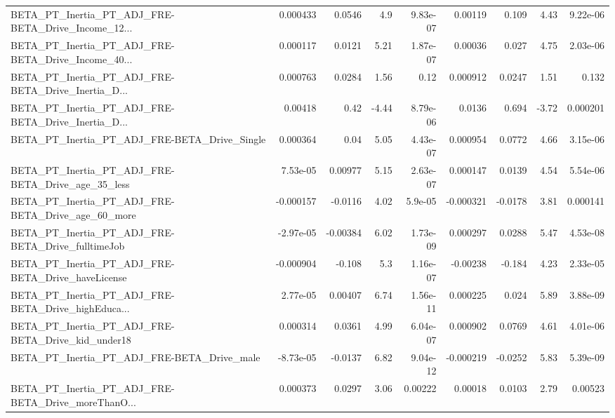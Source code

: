 \begin{tabular}{lrrrrrrrr}
BETA\_PT\_Inertia\_PT\_ADJ\_FRE-BETA\_Drive\_Income\_12... &    0.000433 &       0.0546 &      4.9 & 9.83e-07 &    0.00119 &       0.109 &         4.43 &      9.22e-06 \\
BETA\_PT\_Inertia\_PT\_ADJ\_FRE-BETA\_Drive\_Income\_40... &    0.000117 &       0.0121 &     5.21 & 1.87e-07 &    0.00036 &       0.027 &         4.75 &      2.03e-06 \\
BETA\_PT\_Inertia\_PT\_ADJ\_FRE-BETA\_Drive\_Inertia\_D... &    0.000763 &       0.0284 &     1.56 &     0.12 &   0.000912 &      0.0247 &         1.51 &         0.132 \\
BETA\_PT\_Inertia\_PT\_ADJ\_FRE-BETA\_Drive\_Inertia\_D... &     0.00418 &         0.42 &    -4.44 & 8.79e-06 &     0.0136 &       0.694 &        -3.72 &      0.000201 \\
BETA\_PT\_Inertia\_PT\_ADJ\_FRE-BETA\_Drive\_Single       &    0.000364 &         0.04 &     5.05 & 4.43e-07 &   0.000954 &      0.0772 &         4.66 &      3.15e-06 \\
BETA\_PT\_Inertia\_PT\_ADJ\_FRE-BETA\_Drive\_age\_35\_less  &    7.53e-05 &      0.00977 &     5.15 & 2.63e-07 &   0.000147 &      0.0139 &         4.54 &      5.54e-06 \\
BETA\_PT\_Inertia\_PT\_ADJ\_FRE-BETA\_Drive\_age\_60\_more  &   -0.000157 &      -0.0116 &     4.02 &  5.9e-05 &  -0.000321 &     -0.0178 &         3.81 &      0.000141 \\
BETA\_PT\_Inertia\_PT\_ADJ\_FRE-BETA\_Drive\_fulltimeJob  &   -2.97e-05 &     -0.00384 &     6.02 & 1.73e-09 &   0.000297 &      0.0288 &         5.47 &      4.53e-08 \\
BETA\_PT\_Inertia\_PT\_ADJ\_FRE-BETA\_Drive\_haveLicense  &   -0.000904 &       -0.108 &      5.3 & 1.16e-07 &   -0.00238 &      -0.184 &         4.23 &      2.33e-05 \\
BETA\_PT\_Inertia\_PT\_ADJ\_FRE-BETA\_Drive\_highEduca... &    2.77e-05 &      0.00407 &     6.74 & 1.56e-11 &   0.000225 &       0.024 &         5.89 &      3.88e-09 \\
BETA\_PT\_Inertia\_PT\_ADJ\_FRE-BETA\_Drive\_kid\_under18  &    0.000314 &       0.0361 &     4.99 & 6.04e-07 &   0.000902 &      0.0769 &         4.61 &      4.01e-06 \\
BETA\_PT\_Inertia\_PT\_ADJ\_FRE-BETA\_Drive\_male         &   -8.73e-05 &      -0.0137 &     6.82 & 9.04e-12 &  -0.000219 &     -0.0252 &         5.83 &      5.39e-09 \\
BETA\_PT\_Inertia\_PT\_ADJ\_FRE-BETA\_Drive\_moreThanO... &    0.000373 &       0.0297 &     3.06 &  0.00222 &    0.00018 &      0.0103 &         2.79 &       0.00523 \\

\end{tabular}
